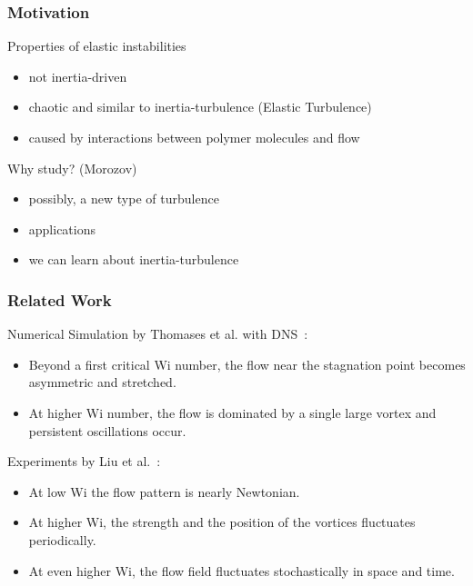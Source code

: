 \begin{frame}
  \frametitle{Motivation}
  \begin{block}{Properties of elastic instabilities}
    \begin{itemize}
    \item not inertia-driven
    \item chaotic and similar to inertia-turbulence (Elastic Turbulence)
    \item caused by interactions between polymer molecules and flow
    \end{itemize}
  \end{block}
  \begin{block}{Why study? (Morozov)}
    \begin{itemize}
    \item possibly, a new type of turbulence
    \item applications
    \item we can learn about inertia-turbulence
    \end{itemize}
  \end{block}
\end{frame}

\begin{frame}
  \frametitle{Related Work}
  \begin{block}{Numerical Simulation by Thomases et al. with DNS~\footnotemark: }
    \begin{itemize}
    \item Beyond a first critical Wi number, the flow near the stagnation point becomes asymmetric and stretched.
    \item At higher Wi number, the flow is dominated by a single large vortex and persistent oscillations occur. 
    \end{itemize}
  \end{block}
  \begin{block}{Experiments by Liu et al.~\footnotemark[2]:}
    \begin{itemize}
    \item  At low Wi the flow pattern is nearly Newtonian. 
    \item At higher Wi, the strength and the position of the vortices fluctuates periodically.
    \item At even higher Wi, the flow field fluctuates stochastically in space and time.
    \end{itemize}
  \end{block}
\end{frame}

